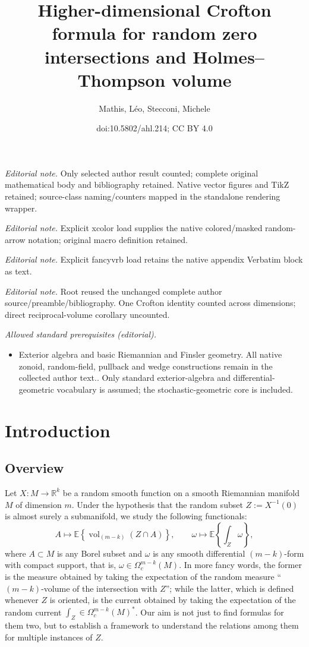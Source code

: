 \documentclass[10pt]{amsart}
\title{Higher-dimensional Crofton formula for random zero intersections and Holmes–Thompson volume}
\author{Mathis, Léo, Stecconi, Michele}
\date{doi:10.5802/ahl.214; CC BY 4.0}
\theoremstyle{definition}\newtheorem{defi}[theo]{Definition}\newtheorem{rema}[theo]{Remark}\newtheorem{exam}[theo]{Example}\newtheorem{exem}[theo]{Example}\newtheorem{nota}[theo]{Notation}
\newcommand{\R}{\mathbb{R}}
\newcommand{\EE}{\mathbb{E}}
\DeclareMathOperator{\vol}{vol}
\begin{document}
\maketitle
\noindent\textit{Editorial note.} Only selected author result counted; complete original mathematical body and bibliography retained. Native vector figures and TikZ retained; source-class naming/counters mapped in the standalone rendering wrapper.\par\medskip
\noindent\textit{Editorial note.} Explicit xcolor load supplies the native colored/masked random-arrow notation; original macro definition retained.\par\medskip
\noindent\textit{Editorial note.} Explicit fancyvrb load retains the native appendix Verbatim block as text.\par\medskip
\noindent\textit{Editorial note.} Root reused the unchanged complete author source/preamble/bibliography. One Crofton identity counted across dimensions; direct reciprocal-volume corollary uncounted.\par\medskip
\noindent\textit{Allowed standard prerequisites (editorial).}\begin{itemize}
\item Exterior algebra and basic Riemannian and Finsler geometry. All native zonoid, random-field, pullback and wedge constructions remain in the collected author text.. Only standard exterior-algebra and differential-geometric vocabulary is assumed; the stochastic-geometric core is included.
\end{itemize}\medskip

\section{Introduction}\label{sec:intro}
\subsection{Overview}

Let $X\colon M\to \R^k$ be a random smooth function on a smooth Riemannian manifold $M$ of dimension $m$. Under the hypothesis that the random subset $Z:=X^{-1}(0)$ is almost surely a submanifold, we study the following functionals:
\begin{equation}\label{eq:rhoalpha1}
A\mapsto\EE\left\{\vol_{(m-k)}(Z\cap A)\right\}, \qquad \omega\mapsto \EE\left\{\int_{Z} \omega\right\},
\end{equation}
where $A\subset M$ is any Borel subset and $\omega$ is any smooth differential $(m-k)$-form with compact support, that is, $\omega\in \Omega_c^{m-k}(M)$. In more fancy words, the former is the measure obtained by taking the expectation of the random measure ``$(m-k)$-volume of the intersection with $Z$''; while the latter, which is defined whenever $Z$ is oriented, is the current obtained by taking the expectation of the random current $\int_Z\in \Omega_c^{m-k}(M)^*$. Our aim is not just to find formulas for them two, but to establish a framework to understand the relations among them for multiple instances of $Z$.
\end{document}
